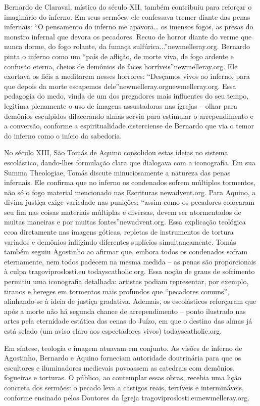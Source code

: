 Bernardo de Claraval, místico do século XII, também contribuiu para reforçar o imaginário do inferno. Em seus sermões, ele confessava tremer diante das penas infernais: “O pensamento do inferno me apavora\ldots{} os imensos fogos, as presas do monstro infernal que devora os pecadores. Recuo de horror diante do verme que nunca dorme, do fogo rolante, da fumaça sulfúrica...”newmelleray.org. Bernardo pinta o inferno como um “país de aflição, de morte viva, de fogo ardente e confusão eterna, cheios de demônios de faces horríveis”newmelleray.org. Ele exortava os fiéis a meditarem nesses horrores: “Desçamos vivos ao inferno, para que depois da morte escapemos dele”newmelleray.orgnewmelleray.org. Essa pedagogia do medo, vinda de um dos pregadores mais influentes do seu tempo, legitima plenamente o uso de imagens assustadoras nas igrejas -- olhar para demônios esculpidos dilacerando almas servia para estimular o arrependimento e a conversão, conforme a espiritualidade cisterciense de Bernardo que via o temor do inferno como o início da sabedoria.

No século XIII, São Tomás de Aquino consolidou estas ideias no sistema escolástico, dando-lhes formulação clara que dialogava com a iconografia. Em sua Summa Theologiae, Tomás discute minuciosamente a natureza das penas infernais. Ele confirma que no inferno os condenados sofrem múltiplos tormentos, não só o fogo material mencionado nas Escrituras newadvent.org. Para Aquino, a divina justiça exige variedade nas punições: “assim como os pecadores colocaram seu fim nas coisas materiais múltiplas e diversas, devem ser atormentados de muitas maneiras e por muitas fontes”newadvent.org. Essa explicação teológica ecoa diretamente nas imagens góticas, repletas de instrumentos de tortura variados e demônios infligindo diferentes suplícios simultaneamente. Tomás também seguiu Agostinho ao afirmar que, embora todos os condenados sofram eternamente, nem todos padecem na mesma medida -- as penas são proporcionais à culpa tragoviproslosti.eu todayscatholic.org. Essa noção de graus de sofrimento permitiu uma iconografia detalhada: artistas podiam representar, por exemplo, tiranos e hereges em tormentos mais profundos que “pecadores comuns”, alinhando-se à ideia de justiça gradativa. Ademais, os escolásticos reforçaram que após a morte não há segunda chance de arrependimento -- ponto ilustrado nas artes pela eternidade estática das cenas do Juízo, em que o destino das almas já está selado (um aviso claro aos espectadores vivos) todayscatholic.org.

Em síntese, teologia e imagem atuavam em conjunto. As visões de inferno de Agostinho, Bernardo e Aquino forneciam autoridade doutrinária para que os escultores e iluminadores medievais povoassem as catedrais com demônios, fogueiras e torturas. O público, ao contemplar essas obras, recebia uma lição concreta dos sermões: o pecado leva a castigos reais, terríveis e intermináveis, conforme ensinado pelos Doutores da Igreja tragoviproslosti.eunewmelleray.org.

